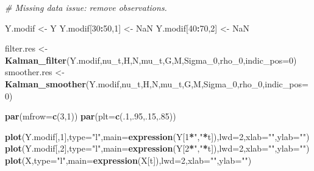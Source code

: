 \documentclass[
  12pt,
]{book}
\newenvironment{Shaded}{\begin{snugshade}}{\end{snugshade}}
\newcommand{\AttributeTok}[1]{\textcolor[rgb]{0.13,0.29,0.53}{#1}}
\newcommand{\CommentTok}[1]{\textcolor[rgb]{0.56,0.35,0.01}{\textit{#1}}}
\newcommand{\ConstantTok}[1]{\textcolor[rgb]{0.56,0.35,0.01}{#1}}
\newcommand{\DecValTok}[1]{\textcolor[rgb]{0.00,0.00,0.81}{#1}}
\newcommand{\FunctionTok}[1]{\textcolor[rgb]{0.13,0.29,0.53}{\textbf{#1}}}
\newcommand{\NormalTok}[1]{#1}
\newcommand{\OtherTok}[1]{\textcolor[rgb]{0.56,0.35,0.01}{#1}}
\newcommand{\SpecialCharTok}[1]{\textcolor[rgb]{0.81,0.36,0.00}{\textbf{#1}}}
\newcommand{\StringTok}[1]{\textcolor[rgb]{0.31,0.60,0.02}{#1}}
\theoremstyle{definition}
\theoremstyle{definition}
\theoremstyle{definition}
\theoremstyle{definition}
\theoremstyle{remark}
\begin{document}
\begin{Shaded}
\begin{Highlighting}[]
\CommentTok{\# Missing data issue: remove observations.}

\NormalTok{Y.modif }\OtherTok{\textless{}{-}}\NormalTok{ Y}
\NormalTok{Y.modif[}\DecValTok{30}\SpecialCharTok{:}\DecValTok{50}\NormalTok{,}\DecValTok{1}\NormalTok{] }\OtherTok{\textless{}{-}} \ConstantTok{NaN}
\NormalTok{Y.modif[}\DecValTok{40}\SpecialCharTok{:}\DecValTok{70}\NormalTok{,}\DecValTok{2}\NormalTok{] }\OtherTok{\textless{}{-}} \ConstantTok{NaN}

\NormalTok{filter.res }\OtherTok{\textless{}{-}}     \FunctionTok{Kalman\_filter}\NormalTok{(Y.modif,nu\_t,H,N,mu\_t,G,M,Sigma\_0,rho\_0,}\AttributeTok{indic\_pos=}\DecValTok{0}\NormalTok{)}
\NormalTok{smoother.res }\OtherTok{\textless{}{-}} \FunctionTok{Kalman\_smoother}\NormalTok{(Y.modif,nu\_t,H,N,mu\_t,G,M,Sigma\_0,rho\_0,}\AttributeTok{indic\_pos=}\DecValTok{0}\NormalTok{)}

\FunctionTok{par}\NormalTok{(}\AttributeTok{mfrow=}\FunctionTok{c}\NormalTok{(}\DecValTok{3}\NormalTok{,}\DecValTok{1}\NormalTok{))}
\FunctionTok{par}\NormalTok{(}\AttributeTok{plt=}\FunctionTok{c}\NormalTok{(.}\DecValTok{1}\NormalTok{,.}\DecValTok{95}\NormalTok{,.}\DecValTok{15}\NormalTok{,.}\DecValTok{85}\NormalTok{))}

\FunctionTok{plot}\NormalTok{(Y.modif[,}\DecValTok{1}\NormalTok{],}\AttributeTok{type=}\StringTok{"l"}\NormalTok{,}\AttributeTok{main=}\FunctionTok{expression}\NormalTok{(Y[}\DecValTok{1}\SpecialCharTok{*}\StringTok{","}\SpecialCharTok{*}\NormalTok{t]),}\AttributeTok{lwd=}\DecValTok{2}\NormalTok{,}\AttributeTok{xlab=}\StringTok{""}\NormalTok{,}\AttributeTok{ylab=}\StringTok{""}\NormalTok{)}
\FunctionTok{plot}\NormalTok{(Y.modif[,}\DecValTok{2}\NormalTok{],}\AttributeTok{type=}\StringTok{"l"}\NormalTok{,}\AttributeTok{main=}\FunctionTok{expression}\NormalTok{(Y[}\DecValTok{2}\SpecialCharTok{*}\StringTok{","}\SpecialCharTok{*}\NormalTok{t]),}\AttributeTok{lwd=}\DecValTok{2}\NormalTok{,}\AttributeTok{xlab=}\StringTok{""}\NormalTok{,}\AttributeTok{ylab=}\StringTok{""}\NormalTok{)}
\FunctionTok{plot}\NormalTok{(X,}\AttributeTok{type=}\StringTok{"l"}\NormalTok{,}\AttributeTok{main=}\FunctionTok{expression}\NormalTok{(X[t]),}\AttributeTok{lwd=}\DecValTok{2}\NormalTok{,}\AttributeTok{xlab=}\StringTok{""}\NormalTok{,}\AttributeTok{ylab=}\StringTok{""}\NormalTok{)}
\end{Highlighting}
\end{Shaded}
\end{document}
